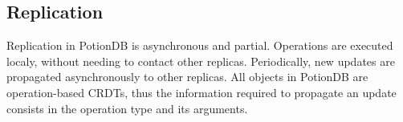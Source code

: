 \documentclass{vldb}
\newcommand{\grumbler}[2]{{\color{red}{\bf #1:} #2}}
\renewcommand{\grumbler}[2]{}
\newcommand{\andre}[1]{\grumbler{andre}{#1}}
\begin{document}
%
%
%
%
%
%

\subsection{Replication}
\label{subsec:replication}

\andre{Note: If we decide to keep this section, maybe I should add a scheme showing each server "subscribing" buckets and another with the operations being sent?}

Replication in PotionDB is asynchronous and partial.
Operations are executed localy, without needing to contact other replicas.
Periodically, new updates are propagated asynchronously to other replicas.
All objects in PotionDB are operation-based CRDTs, thus the information required to propagate an update consists in the operation type and its arguments.
\end{document}
